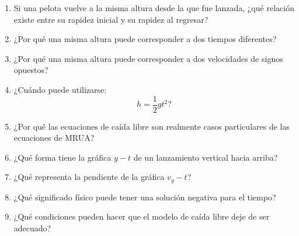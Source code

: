 \begin{enumerate}
    \item Si una pelota vuelve a la misma altura desde la que fue lanzada, ¿qué relación existe entre su rapidez inicial y su rapidez al regresar?

    \item ¿Por qué una misma altura puede corresponder a dos tiempos diferentes?

    \item ¿Por qué una misma altura puede corresponder a dos velocidades de signos opuestos?

    \item ¿Cuándo puede utilizarse:
    \[
    h=\frac{1}{2}gt^2?
    \]

    \item ¿Por qué las ecuaciones de caída libre son realmente casos particulares de las ecuaciones de MRUA?

    \item ¿Qué forma tiene la gráfica \(y-t\) de un lanzamiento vertical hacia arriba?

    \item ¿Qué representa la pendiente de la gráfica \(v_y-t\)?

    \item ¿Qué significado físico puede tener una solución negativa para el tiempo?

    \item ¿Qué condiciones pueden hacer que el modelo de caída libre deje de ser adecuado?
\end{enumerate}


